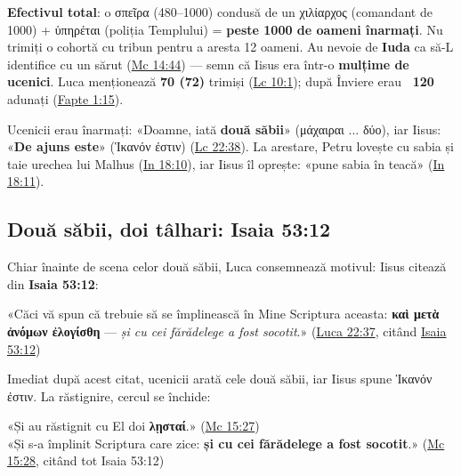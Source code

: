 \documentclass[12pt,a4paper,twoside,openany]{book}
\begin{document}
\textbf{Efectivul total}: o σπεῖρα (480--1000) condusă de un χιλίαρχος (comandant de 1000) + ὑπηρέται (poliția Templului) = \textbf{peste 1000 de oameni înarmați}. Nu trimiți o cohortă cu tribun pentru a aresta 12 oameni. Au nevoie de \textbf{Iuda} ca să-L identifice cu un sărut (\href{https://bibliaortodoxa.ro/carte.php?id=53\&cap=14\#44}{Mc 14:44}) — semn că Iisus era într-o \textbf{mulțime de ucenici}. Luca menționează \textbf{70 (72)} trimiși (\href{https://bibliaortodoxa.ro/carte.php?id=48\&cap=10\#1}{Lc 10:1}); după Înviere erau \textbf{~120} adunați (\href{https://bibliaortodoxa.ro/carte.php?id=26\&cap=1\#15}{Fapte 1:15}).

Ucenicii erau înarmați: «Doamne, iată \textbf{două săbii}» (μάχαιραι ... δύο), iar Iisus: «\textbf{De ajuns este}» (Ἱκανόν ἐστιν) (\href{https://bibliaortodoxa.ro/carte.php?id=48\&cap=22\#38}{Lc 22:38}). La arestare, Petru lovește cu sabia și taie urechea lui Malhus (\href{https://bibliaortodoxa.ro/carte.php?id=35\&cap=18\#10}{In 18:10}), iar Iisus îl oprește: «pune sabia în teacă» (\href{https://bibliaortodoxa.ro/carte.php?id=35\&cap=18\#11}{In 18:11}).

\subsection{Două săbii, doi tâlhari: Isaia 53:12}

Chiar înainte de scena celor două săbii, Luca consemnează motivul: Iisus citează din \textbf{Isaia 53:12}:

\begin{biblequote}
«Căci vă spun că trebuie să se împlinească în Mine Scriptura aceasta: \textbf{καὶ μετὰ ἀνόμων ἐλογίσθη} — \textit{și cu cei fărădelege a fost socotit}.» (\href{https://bibliaortodoxa.ro/carte.php?id=48\&cap=22\#37}{Luca 22:37}, citând \href{https://bibliaortodoxa.ro/carte.php?id=25\&cap=53\#12}{Isaia 53:12})
\end{biblequote}

Imediat după acest citat, ucenicii arată cele două săbii, iar Iisus spune Ἱκανόν ἐστιν. La răstignire, cercul se închide:

\begin{biblequote}
«Și au răstignit cu El doi \textbf{λῃσταί}.» (\href{https://bibliaortodoxa.ro/carte.php?id=53\&cap=15\#27}{Mc 15:27})\\
«Și s-a împlinit Scriptura care zice: \textbf{și cu cei fărădelege a fost socotit}.» (\href{https://bibliaortodoxa.ro/carte.php?id=53\&cap=15\#28}{Mc 15:28}, citând tot Isaia 53:12)
\end{biblequote}
\end{document}
